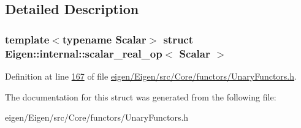 \subsection{Detailed Description}
\subsubsection*{template$<$typename Scalar$>$\newline
struct Eigen\+::internal\+::scalar\+\_\+real\+\_\+op$<$ Scalar $>$}



Definition at line \hyperlink{eigen_2_eigen_2src_2_core_2functors_2_unary_functors_8h_source_l00167}{167} of file \hyperlink{eigen_2_eigen_2src_2_core_2functors_2_unary_functors_8h_source}{eigen/\+Eigen/src/\+Core/functors/\+Unary\+Functors.\+h}.



The documentation for this struct was generated from the following file\+:\begin{DoxyCompactItemize}
\item 
eigen/\+Eigen/src/\+Core/functors/\+Unary\+Functors.\+h\end{DoxyCompactItemize}
